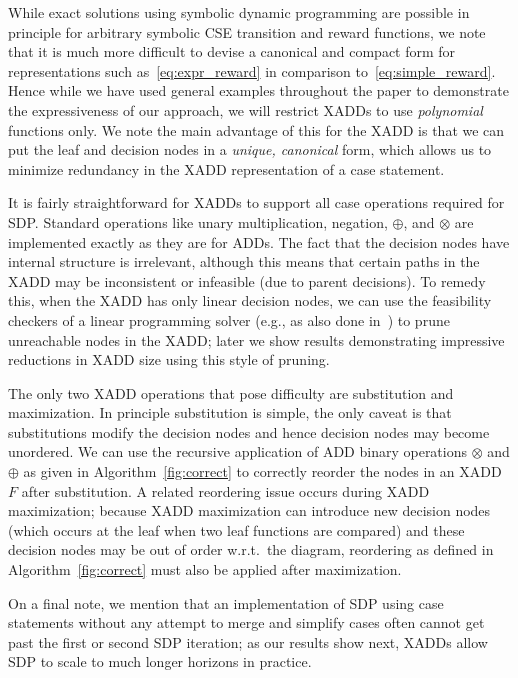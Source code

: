 \documentclass[letterpaper]{article}
\begin{document}
While exact solutions using symbolic dynamic
programming are possible in principle for arbitrary symbolic CSE transition
and reward functions, we note that it is much more difficult to
devise a canonical and compact form for representations 
such as~\eqref{eq:expr_reward}
in comparison to~\eqref{eq:simple_reward}.
Hence while we have used general examples throughout the paper
to demonstrate the expressiveness of our approach, we will restrict
XADDs to use \emph{polynomial} functions only.  We note the main advantage
of this for the XADD is that we can put the leaf and decision nodes
in a \emph{unique, canonical} form, which allows us to minimize 
redundancy in the XADD representation of a case statement.

It is fairly straightforward for XADDs to support all case operations
required for SDP.  Standard operations like unary multiplication,
negation, $\oplus$, and $\otimes$ are implemented exactly as they
are for ADDs.  The fact that the decision nodes have internal structure
is irrelevant, although this means that certain paths in the XADD
may be inconsistent or infeasible (due to parent decisions).  To
remedy this, when the XADD has only linear decision 
nodes, we can use the feasibility checkers of
a linear programming solver (e.g., as also done in~\cite{penberthy94}) 
to prune unreachable nodes in the XADD; later we show results demonstrating
impressive reductions in XADD size using this style of pruning.

The only two XADD operations that pose difficulty are substitution
and maximization.  In principle substitution is simple, the only
caveat is that substitutions modify the decision nodes and hence
decision nodes may become unordered.  We can use the 
recursive application of ADD binary operations $\otimes$ and $\oplus$ 
as given in Algorithm~\ref{fig:correct} to correctly reorder the
nodes in an XADD $F$ after substitution.  A related reordering
issue occurs during XADD maximization; because XADD maximization
can introduce new decision nodes (which occurs at the leaf when
two leaf functions are compared) and these decision nodes may
be out of order w.r.t.\ the diagram, reordering as defined
in Algorithm~\ref{fig:correct} must also be applied after
maximization.  

On a final note, we mention that an implementation of SDP using case
statements without any attempt to merge and simplify cases often
cannot get past the first or second SDP iteration; as our results show
next, XADDs allow SDP to scale to much longer horizons in practice.
\end{document}
